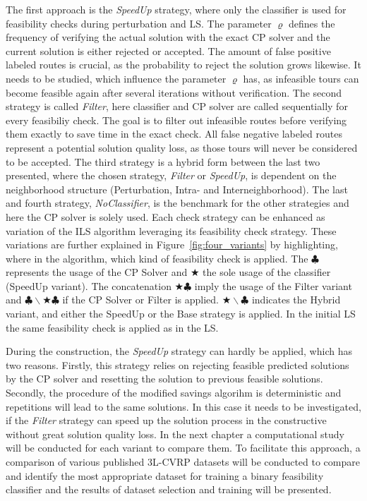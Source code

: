 The first approach is the \textit{SpeedUp} strategy, where only the classifier is used for feasibility checks during perturbation and
\gls{LS}. The parameter $\varrho$ defines the frequency of verifying the actual solution with the exact \gls{CP} solver and
the current solution is either rejected or accepted.
The amount of false positive labeled routes is crucial, as the probability to reject the solution grows likewise. It needs
to be studied, which influence the parameter $\varrho$ has, as infeasible tours can become feasible
again after several iterations without verification.
The second strategy is called \textit{Filter}, here classifier and \gls{CP} solver are called sequentially for every
feasibiliy check. The goal is to filter out infeasible routes before verifying them exactly to save time in the exact check.
All false negative labeled routes represent a potential solution quality loss, as those tours will never be considered to be accepted.
The third strategy is a hybrid form between the last two presented, where the chosen strategy, \textit{Filter} or \textit{SpeedUp},
is dependent on the neighborhood structure (Perturbation, Intra- and Interneighborhood). The last and fourth strategy, \textit{NoClassifier}, is the benchmark
for the other strategies and here the \gls{CP} solver is solely used. Each check strategy can be enhanced as variation of the \gls{ILS}
algorithm leveraging its feasibility check strategy. These variations are further explained in Figure~\ref{fig:four_variants} by highlighting, where
in the algorithm, which kind of feasibility check is applied. The $\clubsuit$ represents the usage of the \gls{CP} Solver and
$\bigstar$ the sole usage of the classifier (SpeedUp variant). The concatenation $\bigstar\clubsuit$ imply the usage of the Filter
variant and \(\clubsuit \backslash \bigstar\clubsuit\) if the \gls{CP} Solver or Filter is applied. \(\bigstar\backslash\clubsuit\)
indicates the Hybrid variant, and either the SpeedUp or the Base strategy is applied. In the initial \gls{LS} the same
feasibility check is applied as in the \gls{LS}.


\FloatBarrier
During the construction, the \textit{SpeedUp} strategy can hardly be applied, which has two reasons. Firstly, this strategy relies
on rejecting feasible predicted solutions by the \gls{CP} solver and resetting the solution to previous feasible solutions.
Secondly, the procedure of the modified savings algorihm is deterministic and repetitions will lead to the same solutions. In this
case it needs to be investigated, if the \textit{Filter} strategy can speed up the solution process in the constructive without
great solution quality loss. In the next chapter a computational study will be conducted for each variant to compare them. To facilitate this approach,
a comparison of various published \gls{3L-CVRP} datasets will be conducted to compare and identify the most appropriate
dataset for training a binary feasibility classifier and the results of dataset selection and training will be presented.

